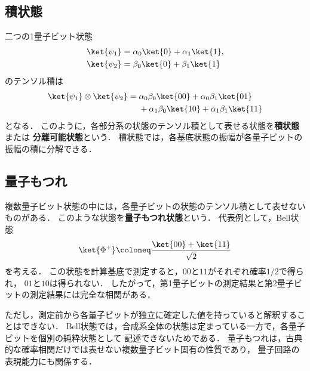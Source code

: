 \subsection{積状態}
\label{subsec:product-state}

二つの1量子ビット状態
\begin{align*}
  \ket{\psi_1}
  &=
  \alpha_0\ket{0}+\alpha_1\ket{1}, \\
  \ket{\psi_2}
  &=
  \beta_0\ket{0}+\beta_1\ket{1}
\end{align*}
のテンソル積は
\begin{align*}
  \ket{\psi_1}\otimes\ket{\psi_2}
  ={}&
  \alpha_0\beta_0\ket{00}
  +\alpha_0\beta_1\ket{01} \\
  &+\alpha_1\beta_0\ket{10}
  +\alpha_1\beta_1\ket{11}
\end{align*}
となる．
このように，各部分系の状態のテンソル積として表せる状態を\textbf{積状態}または
\textbf{分離可能状態}という．
積状態では，各基底状態の振幅が各量子ビットの振幅の積に分解できる．

\subsection{量子もつれ}
\label{subsec:entanglement}

複数量子ビット状態の中には，各量子ビットの状態のテンソル積として表せないものがある．
このような状態を\textbf{量子もつれ状態}という．
代表例として，Bell状態
\begin{equation}
  \ket{\Phi^+}
  \coloneq
  \frac{\ket{00}+\ket{11}}{\sqrt{2}}
  \label{eq:bell-state}
\end{equation}
を考える．
この状態を計算基底で測定すると，$00$と$11$がそれぞれ確率$1/2$で得られ，
$01$と$10$は得られない．
したがって，第1量子ビットの測定結果と第2量子ビットの測定結果には完全な相関がある．

ただし，測定前から各量子ビットが独立に確定した値を持っていると解釈することはできない．
Bell状態では，合成系全体の状態は定まっている一方で，各量子ビットを個別の純粋状態として
記述できないためである．
量子もつれは，古典的な確率相関だけでは表せない複数量子ビット固有の性質であり，
量子回路の表現能力にも関係する．
